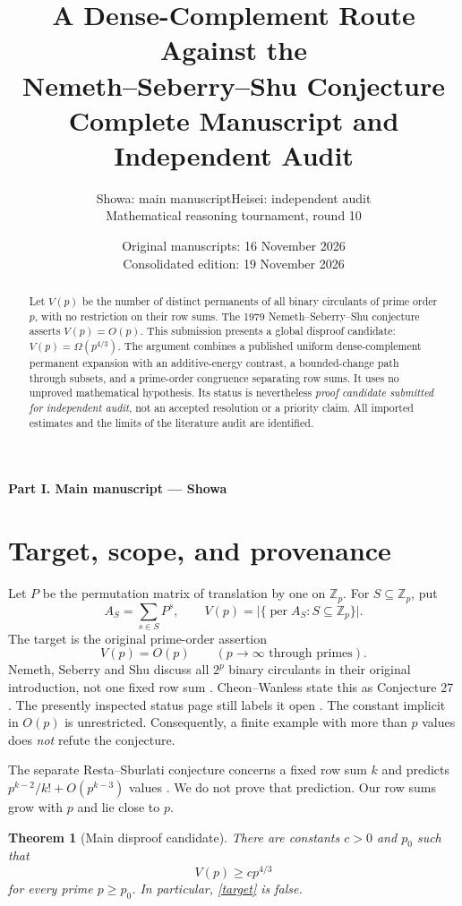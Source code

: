 \documentclass[11pt,a4paper]{article}
\title{A Dense-Complement Route Against the\\Nemeth--Seberry--Shu Conjecture\\[7pt]\large Complete Manuscript and Independent Audit}
\author{Showa: main manuscript\qquad Heisei: independent audit\\[3pt]\small Mathematical reasoning tournament, round 10}
\date{Original manuscripts: 16 November 2026\\\small Consolidated edition: 19 November 2026}
\newcommand{\per}{\operatorname{per}}
\newcommand{\Z}{\mathbb Z}
\newtheorem{theorem}{Theorem}
\begin{document}
\maketitle
\begin{center}\small
\textbf{Part I. Main manuscript --- Showa}
\end{center}
\begin{abstract}
Let $V(p)$ be the number of distinct permanents of all binary circulants of prime order $p$, with no restriction on their row sums. The 1979 Nemeth--Seberry--Shu conjecture asserts $V(p)=O(p)$. This submission presents a global disproof candidate: $V(p)=\Omega(p^{4/3})$. The argument combines a published uniform dense-complement permanent expansion with an additive-energy contrast, a bounded-change path through subsets, and a prime-order congruence separating row sums. It uses no unproved mathematical hypothesis. Its status is nevertheless \emph{proof candidate submitted for independent audit}, not an accepted resolution or a priority claim. All imported estimates and the limits of the literature audit are identified.
\end{abstract}

\section{Target, scope, and provenance}
Let $P$ be the permutation matrix of translation by one on $\Z_p$. For $S\subseteq\Z_p$, put
\[
 A_S=\sum_{s\in S}P^s,\qquad
 V(p)=\bigl|\{\per A_S:S\subseteq\Z_p\}\bigr|.
\]
The target is the original prime-order assertion
\begin{equation}\label{target}
 V(p)=O(p)\qquad(p\longrightarrow\infty\text{ through primes}).
\end{equation}
Nemeth, Seberry and Shu discuss all $2^p$ binary circulants in their original introduction, not one fixed row sum \cite{NSS}. Cheon--Wanless state this as Conjecture 27 \cite[p.~329]{CW}. The presently inspected status page still labels it open \cite{Lavi}. The constant implicit in $O(p)$ is unrestricted. Consequently, a finite example with more than $p$ values does \emph{not} refute the conjecture.

The separate Resta--Sburlati conjecture concerns a fixed row sum $k$ and predicts $p^{k-2}/k!+O(p^{k-3})$ values \cite{RS,CW}. We do not prove that prediction. Our row sums grow with $p$ and lie close to $p$.

\begin{theorem}[Main disproof candidate]\label{main}
There are constants $c>0$ and $p_0$ such that
\[
 V(p)\ge c p^{4/3}
\]
for every prime $p\ge p_0$. In particular, \eqref{target} is false.
\end{theorem}
\end{document}
